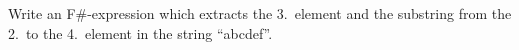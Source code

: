 Write an F\#-expression which extracts the 3.\ element and the substring from the 2.\ to the 4.\ element in the string ``abcdef''.
